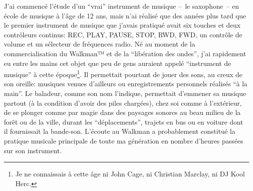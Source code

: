 \noindent J'ai commencé l'étude d'un ``vrai'' instrument de musique --~le saxophone~-- en école de musique à l'âge de 12 ans, mais n'ai réalisé que des années plus tard que le premier instrument de musique que j'avais pratiqué avait six touches et deux contrôleurs continus: REC, PLAY, PAUSE, STOP, RWD, FWD, un contrôle de volume et un sélecteur de fréquences radio. Né au moment de la commercialisation du Walkman™ et de la ``libération des ondes'', j'ai rapidement eu entre les mains cet objet que peu de gens auraient appelé ``instrument de musique'' à cette époque\footnote{Je ne connaissais à cette âge ni John Cage, ni Christian Marclay, ni DJ Kool Herc.}. Il permettait pourtant de jouer des sons, au creux de son oreille: musiques venues d'ailleurs ou enregistrements personnels réalisés ``à la main''. Le baladeur, comme son nom l'indique, permettait d'emmener sa musique partout (à la condition d'avoir des piles chargées), chez soi comme à l'extérieur, de se plonger comme par magie dans des paysages sonores au beau milieu de la forêt ou de la ville, durant les ``déplacements'', trajets en bus ou en voiture dont il fournissait la bande-son. L'écoute au Walkman a probablement constitué la pratique musicale principale de toute ma génération en nombre d'heures passées sur son instrument.

